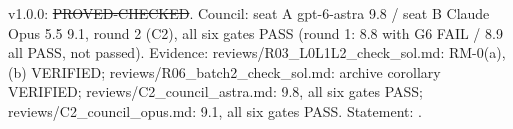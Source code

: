 \begin{theorem}\label{reg:W3-RM_RM-0}
\end{theorem}
\begin{statusbox}
 v1.0.0: \st{PROVED-CHECKED}. Council: seat A gpt-6-astra 9.8 / seat B Claude Opus 5.5 9.1, round 2 (C2), all six gates PASS (round 1: 8.8 with G6 FAIL / 8.9 all PASS, not passed). Evidence: reviews/R03\_L0L1L2\_check\_sol.md: RM-0(a), (b) VERIFIED; reviews/R06\_batch2\_check\_sol.md: archive corollary VERIFIED; reviews/C2\_council\_astra.md: 9.8, all six gates PASS; reviews/C2\_council\_opus.md: 9.1, all six gates PASS. Statement: .
\end{statusbox}
